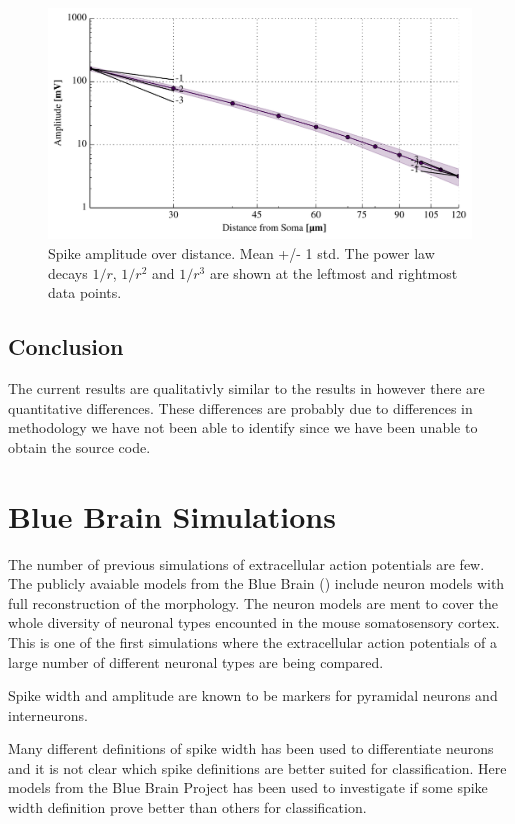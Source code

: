 \documentclass[altfont, fleqn]{uiophd}
\renewcommand{\cref}[1]{{\color{viridis_03}\mycref{#1}}}
\begin{document}
\begin{figure}[thp]
    \centering
    \includegraphics[width=\textwidth]{images/4_1/disc_spike_amps_I_log.pdf}
    \caption{Spike amplitude over distance. Mean +/- 1 std. The power law
    decays $1/r$, $1/r^2$ and $1/r^3$ are shown at the leftmost and rightmost
    data points.}
    \label{fig:4_1_spike_amp}
\end{figure}
\subsection{Conclusion}
The current results are qualitativly similar 
to the results in 
\textcite{pettersen_amplitude_2008}
however there are quantitative differences. 
These differences are probably due to 
differences in methodology we have not been able to
identify since we have been unable to obtain the source code. 

\newpage
\section{Blue Brain Simulations}
The number of previous simulations of extracellular action potentials are
few. 
The publicly avaiable models from the Blue Brain
(\cref{sec:blue_brain})
include neuron models with full reconstruction of the morphology. 
The neuron models are ment to cover the whole diversity of neuronal
types encounted in the mouse somatosensory cortex. 
This is one of the first simulations where 
the extracellular action potentials
of a large number of different neuronal types are being compared. 

Spike width and amplitude are known to be markers 
for pyramidal neurons and interneurons. 

Many different definitions of spike width has been used to differentiate neurons
and it is not clear which spike definitions are better suited for classification.
Here models from the Blue Brain Project
has been used to investigate
if some spike width definition prove better than others for classification.
\newline
\end{document}
